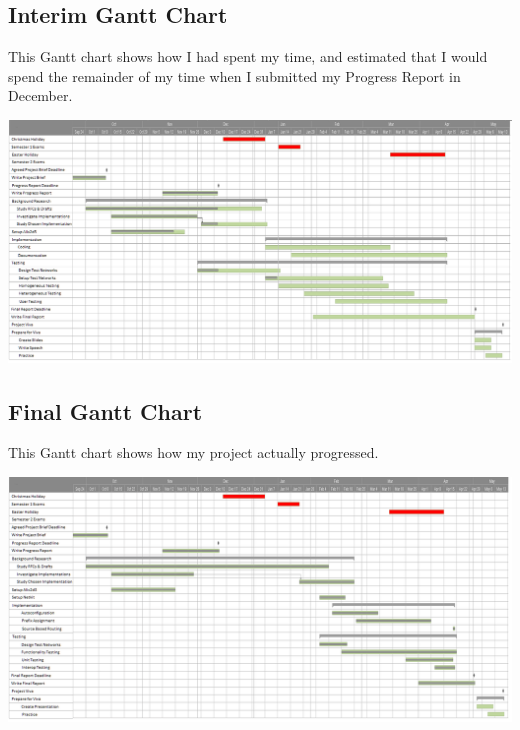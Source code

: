 \documentclass[12pt,a4paper,twoside]{report}
\begin{document}
\pagebreak
\begin{landscape} 
\subsection{Interim Gantt Chart}
This Gantt chart shows how I had spent my time, and estimated that I would
spend the remainder of my time when I submitted my Progress Report in December. 

\begin{center}
  \hspace*{-0.75cm}
  \includegraphics[width=1.\linewidth]{../Gantt/EvenBetterDec.png}
\end{center}

\pagebreak

\subsection{Final Gantt Chart}
This Gantt chart shows how my project actually progressed.

\begin{center}
  \hspace*{-0.75cm}
  \includegraphics[width=1.\linewidth]{../Gantt/EvenBetterApril.png}
\end{center}

\end{landscape}
\end{document}
